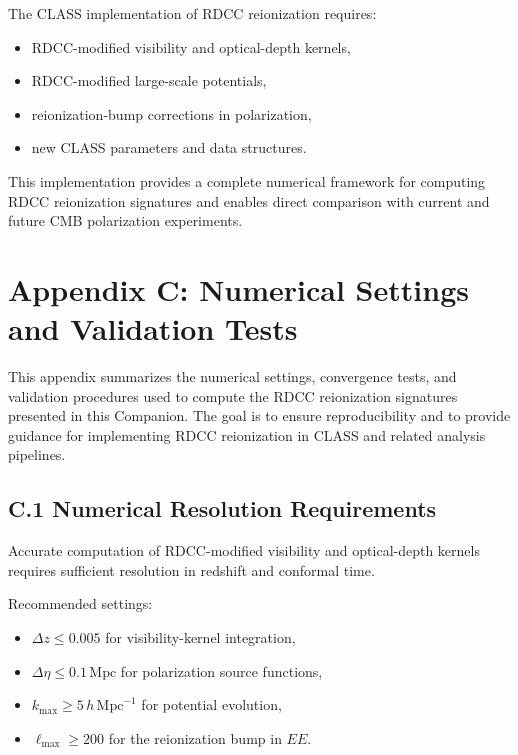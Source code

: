 \documentclass[11pt,a4paper]{article}
\begin{document}
The CLASS implementation of RDCC reionization requires:

\begin{itemize}
\item RDCC-modified visibility and optical-depth kernels,
\item RDCC-modified large-scale potentials,
\item reionization-bump corrections in polarization,
\item new CLASS parameters and data structures.
\end{itemize}

This implementation provides a complete numerical framework for computing RDCC
reionization signatures and enables direct comparison with current and future CMB
polarization experiments.

\section*{Appendix C: Numerical Settings and Validation Tests}

This appendix summarizes the numerical settings, convergence tests, and validation procedures
used to compute the RDCC reionization signatures presented in this Companion. The goal is to
ensure reproducibility and to provide guidance for implementing RDCC reionization in CLASS
and related analysis pipelines.

\subsection*{C.1 Numerical Resolution Requirements}

Accurate computation of RDCC-modified visibility and optical-depth kernels requires sufficient
resolution in redshift and conformal time.

Recommended settings:
\begin{itemize}
\item $\Delta z \leq 0.005$ for visibility-kernel integration,
\item $\Delta \eta \leq 0.1\,\mathrm{Mpc}$ for polarization source functions,
\item $k_{\mathrm{max}} \geq 5\,h\,\mathrm{Mpc}^{-1}$ for potential evolution,
\item $\ell_{\mathrm{max}} \geq 200$ for the reionization bump in $EE$.
\end{itemize}
\end{document}
